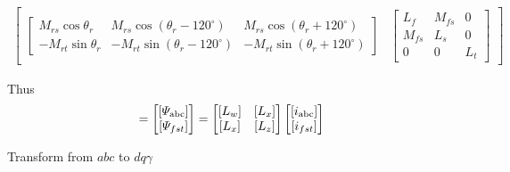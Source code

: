 \documentclass[a4paper,numbers=noenddot,12pt]{scrbook}
\begin{document}
\begin{sideways}
{\begin{multline}
\begin{bmatrix}
\begin{bmatrix}
                            M_{rs} \cos\theta_r & M_{rs} \cos(\theta_r - 120^{\circ}) & M_{rs} \cos(\theta_r + 120^{\circ}) \\
                            - M_{rt} \sin \theta_r & - M_{rt} \sin (\theta_r - 120^{\circ}) & - M_{rt} \sin(\theta_r + 120^{\circ})
                        \end{bmatrix} &
                        \begin{bmatrix}
                            L_f & M_{fs} & 0 \\
                            M_{fs} & L_s & 0 \\
                            0 & 0 & L_t
                        \end{bmatrix}
                    \end{bmatrix}
                    \label{eq:Eq8.22}
                \end{multline}}
            \end{sideways}
            \normalsize
            \newpage

            Thus
            \begin{equation}
                [\varPsi_{\textup{abc}fst}] = 
                \begin{bmatrix}
                    [\varPsi_{\textup{abc}}] \\
                    [\varPsi_{fst}]
                \end{bmatrix}
                =
                \begin{bmatrix}
                    [L_w] & [L_x] \\
                    [L_x] & [L_z]
                \end{bmatrix}
                \begin{bmatrix}
                    [i_{\textup{abc}}] \\
                    [i_{fst}]
                \end{bmatrix}
                \label{eq:Eq8.23}
            \end{equation}

            Transform from $abc$ to $dq\gamma$
            
\end{document}
